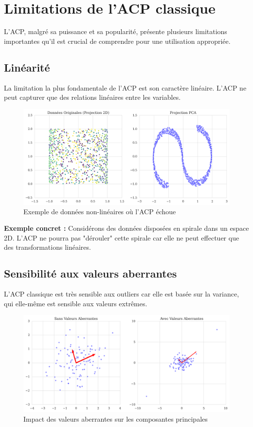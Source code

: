 \documentclass[a4paper,12pt]{report}
\begin{document}
\section{Limitations de l'ACP classique}

L'ACP, malgré sa puissance et sa popularité, présente plusieurs limitations importantes qu'il est crucial de comprendre pour une utilisation appropriée.

\subsection{Linéarité}
La limitation la plus fondamentale de l'ACP est son caractère linéaire. L'ACP ne peut capturer que des relations linéaires entre les variables.

\begin{figure}[H]
  \centering
  \includegraphics[width=1\textwidth]{nonlinear_pca_fail.png}
  \caption{Exemple de données non-linéaires où l'ACP échoue}
  \label{fig:nonlinear_fail}
\end{figure}

\textbf{Exemple concret :} Considérons des données disposées en spirale dans un espace 2D. L'ACP ne pourra pas "dérouler" cette spirale car elle ne peut effectuer que des transformations linéaires.

\subsection{Sensibilité aux valeurs aberrantes}
L'ACP classique est très sensible aux outliers car elle est basée sur la variance, qui elle-même est sensible aux valeurs extrêmes.

\begin{figure}[H]
  \centering
  \includegraphics[width=1\textwidth]{outliers_impact.png}
  \caption{Impact des valeurs aberrantes sur les composantes principales}
  \label{fig:outliers_impact}
\end{figure}
\end{document}
